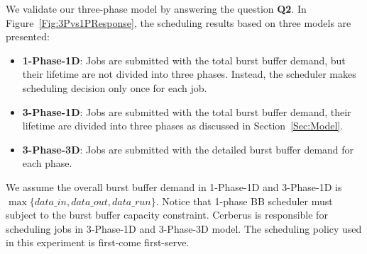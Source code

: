 We validate our three-phase model by answering the question \textbf{Q2}.
In Figure~\ref{Fig:3Pvs1PResponse}, the scheduling results based on three models
are presented:
\begin{itemize}
        \item \textbf{1-Phase-1D}: Jobs are submitted with the total burst buffer demand,
        but their lifetime are not divided into three phases. 
	Instead, the scheduler makes scheduling decision only once for each job.

        \item \textbf{3-Phase-1D}: Jobs are submitted with the total burst buffer demand,
        their lifetime are divided into three phases as discussed in Section~\ref{Sec:Model}.
        
        \item \textbf{3-Phase-3D}: Jobs are submitted with the detailed burst buffer demand for each phase.
\end{itemize}
We assume the overall burst buffer demand in 1-Phase-1D and 3-Phase-1D is
$\max \{data\_in, data\_out, data\_run\}$.
Notice that 1-phase BB scheduler must subject to the burst buffer capacity constraint.
Cerberus is responsible for scheduling jobs in 3-Phase-1D and 3-Phase-3D model.
The scheduling policy used in this experiment is first-come first-serve.

